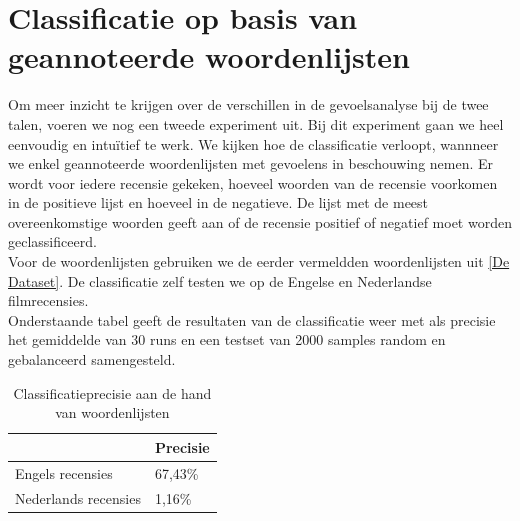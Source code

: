\section{Classificatie op basis van geannoteerde woordenlijsten}\label{Classificatie op basis van geannoteerde woordenlijsten}


Om meer inzicht te krijgen over de verschillen in de gevoelsanalyse bij de twee talen, voeren we nog een tweede experiment uit. Bij dit experiment gaan we heel eenvoudig en intu\"itief te werk. We kijken hoe de classificatie verloopt, wannneer we enkel geannoteerde woordenlijsten met gevoelens in beschouwing nemen. Er wordt voor iedere recensie gekeken, hoeveel woorden van de recensie voorkomen in de positieve lijst en hoeveel in de negatieve. De lijst met de meest overeenkomstige woorden geeft aan of de recensie positief of negatief moet worden geclassificeerd.\\
Voor de woordenlijsten gebruiken we de eerder vermeldden woordenlijsten uit \ref{De Dataset}. De classificatie zelf testen we op de Engelse en Nederlandse filmrecensies.\\
Onderstaande tabel geeft de resultaten van de classificatie weer met als precisie het gemiddelde van 30 runs en een testset van 2000 samples random en gebalanceerd samengesteld.

\begin{table}[h]
\centering
\label{my-label}
\begin{tabular}{l|l|}
\cline{2-2}
                                           & Precisie \\ \hline
\multicolumn{1}{|l|}{Engels recensies}     & 67,43\%  \\ \hline
\multicolumn{1}{|l|}{Nederlands recensies} & 1,16\%   \\ \hline
\end{tabular}
\caption{Classificatieprecisie aan de hand van woordenlijsten}
\end{table}



